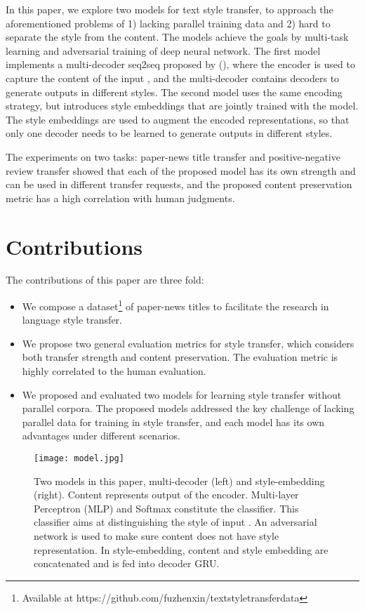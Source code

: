 \documentclass[letterpaper]{article} \usepackage{aaai18}  \usepackage{times}  \usepackage{helvet}  \usepackage{courier}  \usepackage{url}  \usepackage{graphicx}  \usepackage{amsmath}
\newcommand{\newcite}[1]{\citeauthor{#1} (\citeyear{#1})}
\begin{document}
In this paper, we explore two models for text style transfer, to approach the aforementioned problems of 1) lacking parallel training data and 2) hard to separate  the style from the content. 
The models achieve the goals by multi-task learning \cite{caruana1998multitask} and adversarial training \cite{goodfellow2014generative} of deep neural network.
The first model implements a multi-decoder seq2seq proposed by \newcite{sutskever2014sequence}, 
where the encoder is used to capture the content  of the input , and the 
multi-decoder contains  decoders to generate outputs in different styles. 
The second model uses the same encoding strategy, but introduces style embeddings that are jointly 
trained with the model. The style embeddings are used to augment the encoded representations, so 
that only one decoder needs to be learned to generate outputs in different styles. 

The experiments on two tasks: paper-news title transfer and positive-negative review transfer showed that 
each of the proposed model has its own strength and can be used in different transfer requests, and the proposed content preservation metric has a high correlation with human judgments.


\section{Contributions}
The contributions of this paper are three fold:
\begin{itemize}
\item We compose a dataset\footnote{Available at https://github.com/fuzhenxin/textstyletransferdata} of paper-news titles to facilitate the research in language style transfer. 
\item We propose two general evaluation metrics for style transfer, 
which considers both transfer strength and content preservation. 
The evaluation metric is highly correlated to the human evaluation. 
\item We proposed and evaluated two models for learning style transfer without parallel corpora.  
The proposed models addressed the key challenge of lacking parallel data for training in style transfer,  
and each model has its own advantages under different scenarios.

\end{itemize}




\begin{figure*}[htb]
\centering
\texttt{[image: model.jpg]}
\caption{Two models in this paper, multi-decoder (left) and style-embedding (right). 
   Content  represents output of the encoder. 
   Multi-layer Perceptron (MLP) and Softmax constitute the classifier. 
   This classifier aims at distinguishing the style of input . 
   An adversarial network is used to make sure content  does not have style representation. 
   In style-embedding, content  and style embedding  are concatenated and  is fed into decoder GRU. }
\label{figure_model}
\end{figure*}
\end{document}

